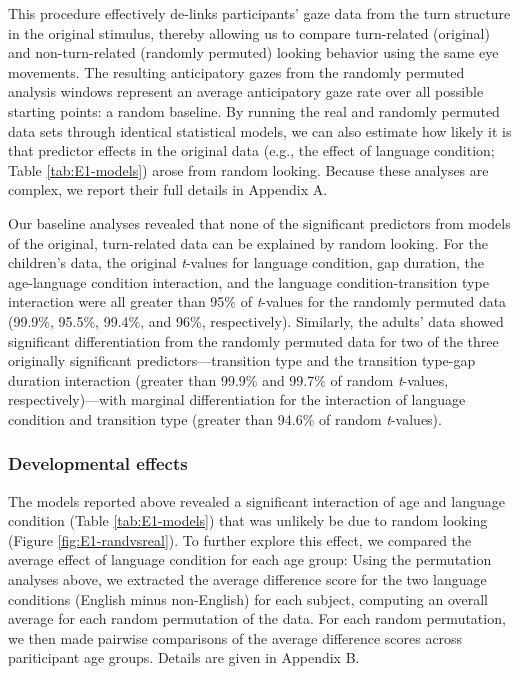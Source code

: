 \documentclass[authoryear, 12pt]{elsarticle}
\begin{document}
This procedure effectively de-links participants' gaze data from the turn structure in the original stimulus, thereby allowing us to compare turn-related (original) and non-turn-related (randomly permuted) looking behavior using the same eye movements. The resulting anticipatory gazes from the randomly permuted analysis windows represent an average anticipatory gaze rate over all possible starting points: a random baseline. By running the real and randomly permuted data sets through identical statistical models, we can also estimate how likely it is that predictor effects in the original data (e.g., the effect of language condition; Table \ref{tab:E1-models}) arose from random looking. Because these analyses are complex, we report their full details in Appendix A. 

Our baseline analyses revealed that none of the significant predictors from models of the original, turn-related data can be explained by random looking. For the children's data, the original \textit{t}-values for language condition, gap duration, the age-language condition interaction, and the language condition-transition type interaction were all greater than 95\% of \textit{t}-values for the randomly permuted data (99.9\%, 95.5\%, 99.4\%, and 96\%, respectively). Similarly, the adults' data showed significant differentiation from the randomly permuted data for two of the three originally significant predictors---transition type and the transition type-gap duration interaction (greater than 99.9\% and 99.7\% of random \textit{t}-values, respectively)---with marginal differentiation for the interaction of language condition and transition type (greater than 94.6\% of random \textit{t}-values).

\subsubsection{Developmental effects}

The models reported above revealed a significant interaction of age and language condition (Table \ref{tab:E1-models}) that was unlikely be due to random looking (Figure \ref{fig:E1-randvsreal}). To further explore this effect, we compared the average effect of language condition for each age group: Using the permutation analyses above, we extracted the average difference score for the two language conditions (English minus non-English) for each subject, computing an overall average for each random permutation of the data. For each random permutation, we then made pairwise comparisons of the average difference scores across pariticipant age groups. Details are given in Appendix B.
\end{document}
